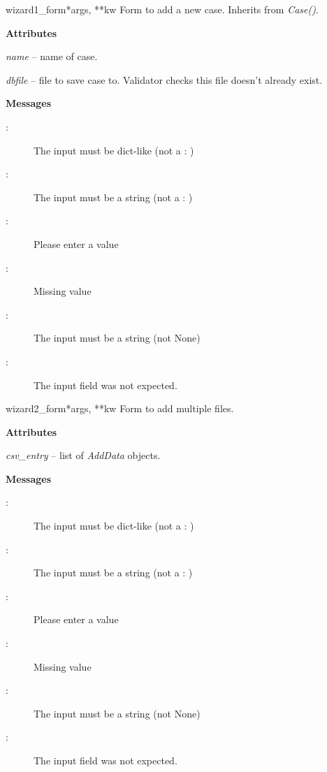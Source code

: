 \documentclass[letterpaper,10pt,english]{manual}
\begin{document}
\hypertarget{webscavator.forms.forms.wizard1_form}{}\begin{classdesc}{wizard1\_form}{*args, **kw}
Form to add a new case. Inherits from \emph{Case()}.

\textbf{Attributes}

\emph{name} -- name of case.

\emph{dbfile} -- file to save case to. Validator checks this file doesn't already exist.

\textbf{Messages}
\begin{description}
\item[:]
The input must be dict-like (not a : )

\item[:]
The input must be a string (not a : )

\item[:]
Please enter a value

\item[:]
Missing value

\item[:]
The input must be a string (not None)

\item[:]
The input field  was not expected.

\end{description}
\end{classdesc}

\hypertarget{webscavator.forms.forms.wizard2_form}{}\begin{classdesc}{wizard2\_form}{*args, **kw}
Form to add multiple files.

\textbf{Attributes}

\emph{csv\_entry} -- list of \emph{AddData} objects.

\textbf{Messages}
\begin{description}
\item[:]
The input must be dict-like (not a : )

\item[:]
The input must be a string (not a : )

\item[:]
Please enter a value

\item[:]
Missing value

\item[:]
The input must be a string (not None)

\item[:]
The input field  was not expected.

\end{description}
\end{classdesc}
\end{document}
